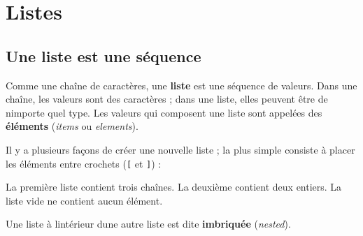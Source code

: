 \hypertarget{listes}{%
\section{Listes}\label{listes}}

\hypertarget{une-liste-est-une-suxe9quence}{%
\subsection{Une liste est une
séquence}\label{une-liste-est-une-suxe9quence}}

Comme une chaîne de caractères, une \textbf{liste} est une séquence de
valeurs. Dans une chaîne, les valeurs sont des caractères ; dans une
liste, elles peuvent être de n\textquotesingle importe quel type. Les
valeurs qui composent une liste sont appelées des \textbf{éléments}
(\emph{items} ou \emph{elements}).

Il y a plusieurs façons de créer une nouvelle liste ; la plus simple
consiste à placer les éléments entre crochets (\texttt{{[}} et
\texttt{{]}}) :

\begin{Shaded}
\begin{Highlighting}[]
\OperatorTok{=}\NormalTok{ [}\NormalTok{, }\NormalTok{, }\NormalTok{]}
\OperatorTok{=}\NormalTok{ [}\NormalTok{, }\NormalTok{]}
\OperatorTok{=}\NormalTok{ []}
\end{Highlighting}
\end{Shaded}

La première liste contient trois chaînes. La deuxième contient deux
entiers. La liste vide ne contient aucun élément.

Une liste à l\textquotesingle intérieur d\textquotesingle une autre
liste est dite \textbf{imbriquée} (\emph{nested}).

\begin{Shaded}
\begin{Highlighting}[]
\OperatorTok{=}\NormalTok{ [}\NormalTok{, }\NormalTok{, }\NormalTok{, [}\NormalTok{, }\NormalTok{]]}
\end{Highlighting}
\end{Shaded}

